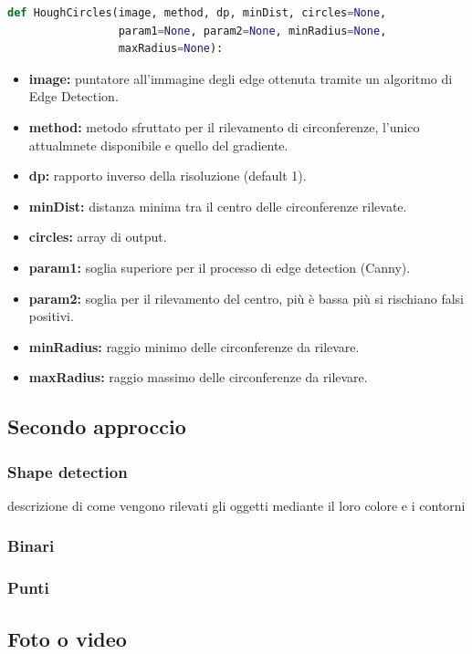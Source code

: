 \documentclass[twoside]{supsistudent}
\begin{document}
\begin{lstlisting}[language=Python]
def HoughCircles(image, method, dp, minDist, circles=None, 
                 param1=None, param2=None, minRadius=None, 
                 maxRadius=None):
\end{lstlisting}
\begin{itemize}
  \item \textbf{image:} puntatore all'immagine degli edge ottenuta tramite un algoritmo di 
  Edge Detection.
  \item \textbf{method:} metodo sfruttato per il rilevamento di circonferenze, 
  l'unico attualmnete disponibile e quello del gradiente.
  \item \textbf{dp:} rapporto inverso della risoluzione (default 1).
  \item \textbf{minDist:} distanza minima tra il centro delle circonferenze rilevate.
  \item \textbf{circles:} array di output.
  \item \textbf{param1:} soglia superiore per il processo di edge detection (Canny).
  \item \textbf{param2:} soglia per il rilevamento del centro, più è bassa più si 
  rischiano falsi positivi.
  \item \textbf{minRadius:} raggio minimo delle circonferenze da rilevare.
  \item \textbf{maxRadius:} raggio massimo delle circonferenze da rilevare.
\end{itemize}

\subsection{Secondo approccio}
\subsubsection{Shape detection}
descrizione di come vengono rilevati gli oggetti mediante il loro colore e i contorni
\subsubsection{Binari}

\subsubsection{Punti}

\subsection{Foto o video}
\end{document}
